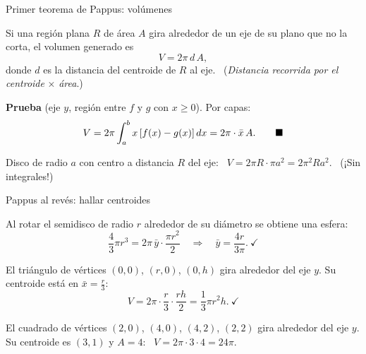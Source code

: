 \documentclass[10pt,aspectratio=169]{beamer}
\begin{document}
\begin{frame}{Primer teorema de Pappus: volúmenes}
  \begin{teorema}
    Si una región plana $R$ de área $A$ gira alrededor de un eje de su plano que no la corta, el volumen generado es
    \[ V=2\pi\,d\,A, \]
    donde $d$ es la distancia del centroide de $R$ al eje. \ (\emph{Distancia recorrida por el centroide} $\times$ \emph{área}.)
  \end{teorema}
  \textbf{Prueba} (eje $y$, región entre $f$ y $g$ con $x\ge0$). Por capas:
  \[ V=2\pi\int_a^bx\,[f(x)-g(x)]\,dx=2\pi\cdot\bar x\,A.\qquad\blacksquare \]
  \begin{ejemplo}[7: toro]
    Disco de radio $a$ con centro a distancia $R$ del eje: \ $V=2\pi R\cdot\pi a^2=2\pi^2Ra^2$. \ (¡Sin integrales!)
  \end{ejemplo}
\end{frame}

\begin{frame}{Pappus al revés: hallar centroides}
  \begin{ejemplo}
    Al rotar el semidisco de radio $r$ alrededor de su diámetro se obtiene una esfera:
    \[ \frac43\pi r^3=2\pi\,\bar y\cdot\frac{\pi r^2}{2}\quad\Rightarrow\quad\bar y=\frac{4r}{3\pi}.\ \checkmark \]
  \end{ejemplo}
  \begin{ejemplo}[9: cono]
    El triángulo de vértices $(0,0)$, $(r,0)$, $(0,h)$ gira alrededor del eje $y$. Su centroide está en $\bar x=\frac r3$:
    \[ V=2\pi\cdot\frac r3\cdot\frac{rh}{2}=\frac13\pi r^2h.\ \checkmark \]
  \end{ejemplo}
  \begin{ejemplo}[10]
    El cuadrado de vértices $(2,0)$, $(4,0)$, $(4,2)$, $(2,2)$ gira alrededor del eje $y$. Su centroide es $(3,1)$ y
    $A=4$: \ $V=2\pi\cdot3\cdot4=24\pi$.
  \end{ejemplo}
\end{frame}
\end{document}

